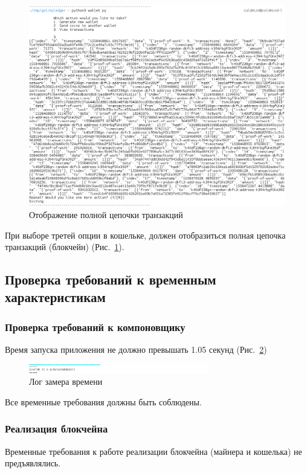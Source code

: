 \begin{figure}[h!]
    \centering
    \includegraphics[width=\textwidth]{./screenshots/full_chain}
    \caption{Отображение полной цепочки транзакций}\label{full_chain}
\end{figure}
При выборе третей опции в кошельке, должен отобразиться полная цепочка
транзакций (блокчейн) (Рис.~\ref{full_chain}).

\newpage
\subsection{Проверка требований к временным характеристикам}
\subsubsection{Проверка требований к компоновщику}
Время запуска приложения не должно превышать 1.05 секунд (Рис.~\ref{launch})

\begin{figure}[h!]
    \centering
    \includegraphics[width=0.7\textwidth]{./screenshots/runtime}
    \caption{Лог замера времени}
    \label{launch}
\end{figure}

Все временные требования должны быть соблюдены.
\subsubsection{Реализация блокчейна}
Временные требования к работе реализации блокчейна (майнера и кошелька) не предъявлялись.
